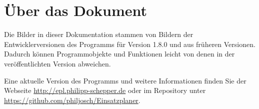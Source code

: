 \section{Über das Dokument}\label{epl:allg:sonstiges}
Die Bilder in dieser Dokumentation stammen von Bildern der Entwicklerversionen des Programms für Version
1.8.0
und aus früheren Versionen.
Dadurch können Programmobjekte und Funktionen leicht von denen in der veröffentlichten Version abweichen.

Eine aktuelle Version des Programms und weitere Informationen finden Sie der Webseite \url{http://epl.philipp-schepper.de}
oder im Repository unter \url{https://github.com/philjosch/Einsatzplaner}.
